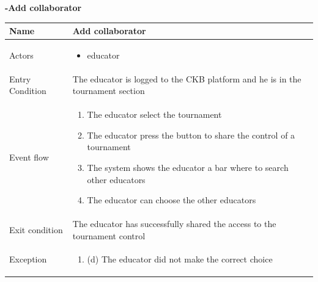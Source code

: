 \begin{enumerate}[label=\textbf{[UC\arabic*]}]
\item \textbf{-Add collaborator}
    \\ \begin{tabular}{|l|p{11cm}|}
        \hline
        Name & Add collaborator\\
        \hline
        Actors & \begin{itemize}
                    \item educator
                \end{itemize} \\
        \hline
        Entry Condition & The educator is logged to the CKB platform and he is in the tournament section\\
        \hline
        Event flow & \begin{enumerate}
            \item The educator select the tournament
            \item The educator press the button to share the control of a tournament
            \item The system shows the educator a bar where to search other educators
            \item The educator can choose the other educators
            
        \end{enumerate}\\
        \hline
        Exit condition & The educator has successfully shared the access to the tournament control  \\
        \hline
        Exception & \begin{enumerate} [label={}, leftmargin=0.25cm ]
            \item (d) The educator did not make the correct choice
        \end{enumerate} \\
        \hline            
    \end{tabular}


\end{enumerate}
